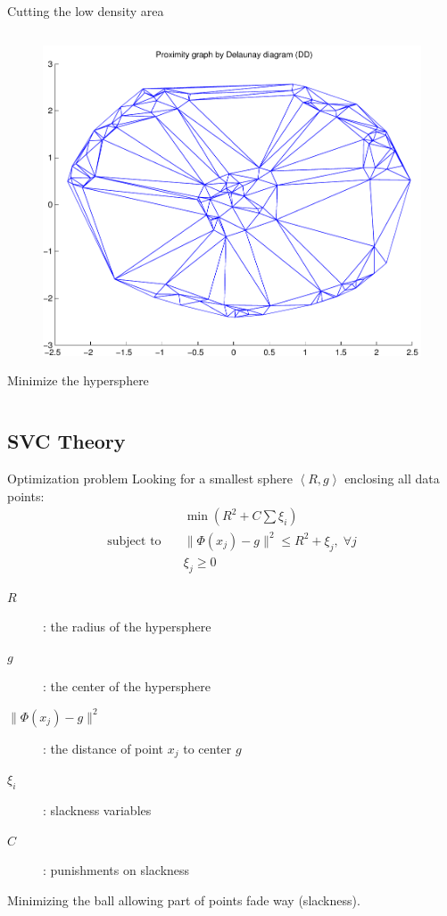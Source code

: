 \begin{frame}{Cutting the low density area}
\begin{columns}
\begin{column}{.5\textwidth}
\begin{figure}
\includegraphics[scale=0.2]{imgs/svc1st.pdf}
\end{figure}
\color{blue}Minimize the hypersphere
\end{column}
\end{columns}
\end{frame}

\subsection{SVC Theory}
\begin{frame}{Optimization problem}
Looking for a smallest sphere $\left\langle R, g\right\rangle$ enclosing all data points:
\begin{align}
\label{eq:svc1}
&\min \left(R^2 + C\sum \xi_i\right)	\nonumber \\
\text{subject to}\quad &  \| \Phi(x_j) - g\|^2 \leq R^2 + \xi_j,\; \forall j \nonumber \\
& \xi_j \geq 0 \nonumber
\end{align} 
\begin{description}
\item[$R$]: the radius of the hypersphere
\item[$g$]: the center of the hypersphere
\item[$\| \Phi(x_j) - g\|^2$]: the distance of point $x_j$ to center $g$
\item[$\xi_i$]: slackness variables
\item[$C$]: punishments on slackness
\end{description}
\pause
\vskip20pt
\color{red} Minimizing the ball allowing part of points fade way (slackness).
\end{frame}

